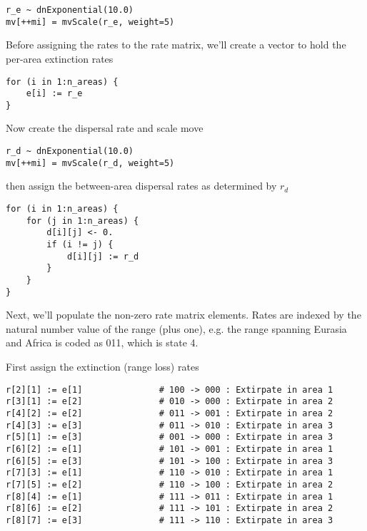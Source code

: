 \begin{snugshade}
\begin{lstlisting}
r_e ~ dnExponential(10.0)
mv[++mi] = mvScale(r_e, weight=5)
\end{lstlisting}
\end{snugshade}

Before assigning the rates to the rate matrix, we'll create a vector to hold the per-area extinction rates 

\begin{snugshade}
\begin{lstlisting}
for (i in 1:n_areas) {
    e[i] := r_e
}
\end{lstlisting}
\end{snugshade}

Now create the dispersal rate and scale move

\begin{snugshade}
\begin{lstlisting}
r_d ~ dnExponential(10.0)
mv[++mi] = mvScale(r_d, weight=5)
\end{lstlisting}
\end{snugshade}

then assign the between-area dispersal rates as determined by {\tt $r_d$}

\begin{snugshade}
\begin{lstlisting}
for (i in 1:n_areas) {
    for (j in 1:n_areas) {
    	d[i][j] <- 0.
        if (i != j) {
            d[i][j] := r_d
        }
    }
}
\end{lstlisting}
\end{snugshade}

Next, we'll populate the non-zero rate matrix elements.
Rates are indexed by the natural number value of the range (plus one), e.g. the range spanning Eurasia and Africa is coded as 011, which is state 4.

First assign the extinction (range loss) rates

\begin{snugshade}
\begin{lstlisting}
r[2][1] := e[1]               # 100 -> 000 : Extirpate in area 1
r[3][1] := e[2]               # 010 -> 000 : Extirpate in area 2
r[4][2] := e[2]               # 011 -> 001 : Extirpate in area 2
r[4][3] := e[3]               # 011 -> 010 : Extirpate in area 3
r[5][1] := e[3]               # 001 -> 000 : Extirpate in area 3
r[6][2] := e[1]               # 101 -> 001 : Extirpate in area 1
r[6][5] := e[3]               # 101 -> 100 : Extirpate in area 3
r[7][3] := e[1]               # 110 -> 010 : Extirpate in area 1
r[7][5] := e[2]               # 110 -> 100 : Extirpate in area 2
r[8][4] := e[1]               # 111 -> 011 : Extirpate in area 1
r[8][6] := e[2]               # 111 -> 101 : Extirpate in area 2
r[8][7] := e[3]               # 111 -> 110 : Extirpate in area 3
\end{lstlisting}
\end{snugshade}

